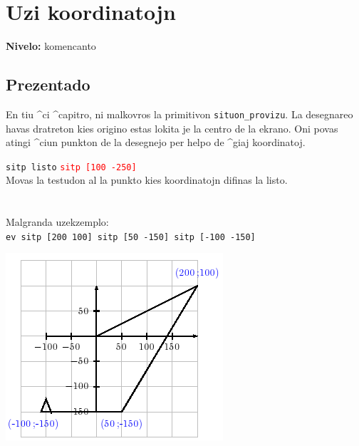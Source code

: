 \chapter{Uzi koordinatojn}
\label{koordinatoj}

{ }\hfill\textbf{Nivelo:} komencanto
\section{Prezentado}
\noindent En tiu ^ci ^capitro, ni malkovros la primitivon
\texttt{situon\_provizu}.  La desegnareo havas dratreton kies origino
estas lokita je la centro de la ekrano.  Oni povas atingi ^ciun
punkton de la desegnejo per helpo de ^giaj koordinatoj.

\texttt{sitp listo}\hspace {4cm } \textcolor{red}{ \texttt{sitp [100 -250]}}\\
Movas la testudon al la punkto kies koordinatojn difinas la listo.\\ \\
\\ Malgranda uzekzemplo:\\
\texttt{ev sitp [200 100] sitp [50 -150] sitp [-100 -150]}
\begin{center}
\includegraphics[scale=0.7]{bildoj/fpos-coord.png}
\end{center}
\vspace{1cm}
